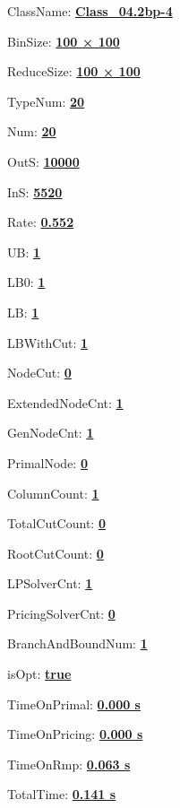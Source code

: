 \documentclass[11pt]{article}
\begin{document}
\pagestyle{empty}


ClassName: \underline{\textbf{Class_04.2bp-4}}
\par
BinSize: \underline{\textbf{100 × 100}}
\par
ReduceSize: \underline{\textbf{100 × 100}}
\par
TypeNum: \underline{\textbf{20}}
\par
Num: \underline{\textbf{20}}
\par
OutS: \underline{\textbf{10000}}
\par
InS: \underline{\textbf{5520}}
\par
Rate: \underline{\textbf{0.552}}
\par
UB: \underline{\textbf{1}}
\par
LB0: \underline{\textbf{1}}
\par
LB: \underline{\textbf{1}}
\par
LBWithCut: \underline{\textbf{1}}
\par
NodeCut: \underline{\textbf{0}}
\par
ExtendedNodeCnt: \underline{\textbf{1}}
\par
GenNodeCnt: \underline{\textbf{1}}
\par
PrimalNode: \underline{\textbf{0}}
\par
ColumnCount: \underline{\textbf{1}}
\par
TotalCutCount: \underline{\textbf{0}}
\par
RootCutCount: \underline{\textbf{0}}
\par
LPSolverCnt: \underline{\textbf{1}}
\par
PricingSolverCnt: \underline{\textbf{0}}
\par
BranchAndBoundNum: \underline{\textbf{1}}
\par
isOpt: \underline{\textbf{true}}
\par
TimeOnPrimal: \underline{\textbf{0.000 s}}
\par
TimeOnPricing: \underline{\textbf{0.000 s}}
\par
TimeOnRmp: \underline{\textbf{0.063 s}}
\par
TotalTime: \underline{\textbf{0.141 s}}
\par
\newpage
\end{document}
